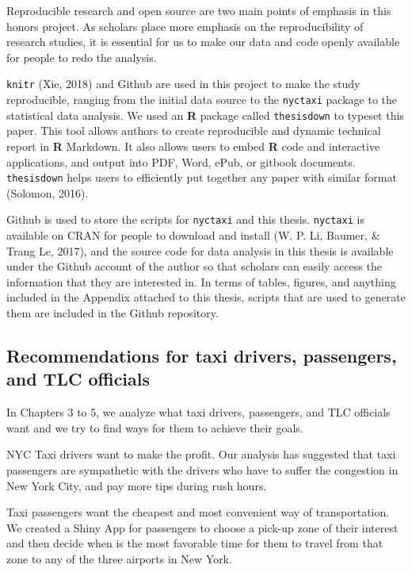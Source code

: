 \documentclass[12pt,twoside]{reedthesis}
\theoremstyle{definition}
\theoremstyle{definition}
\theoremstyle{definition}
\theoremstyle{remark}
\begin{document}
Reproducible research and open source are two main points of emphasis in
this honors project. As scholars place more emphasis on the
reproducibility of research studies, it is essential for us to make our
data and code openly available for people to redo the analysis.

\texttt{knitr} (Xie, 2018) and Github are used in this project to make
the study reproducible, ranging from the initial data source to the
\texttt{nyctaxi} package to the statistical data analysis. We used an
\textbf{R} package called \texttt{thesisdown} to typeset this paper.
This tool allows authors to create reproducible and dynamic technical
report in \textbf{R} Markdown. It also allows users to embed \textbf{R}
code and interactive applications, and output into PDF, Word, ePub, or
gitbook documents. \texttt{thesisdown} helps users to efficiently put
together any paper with similar format (Solomon, 2016).

Github is used to store the scripts for \texttt{nyctaxi} and this
thesis. \texttt{nyctaxi} is available on CRAN for people to download and
install (W. P. Li, Baumer, \& Trang Le, 2017), and the source code for
data analysis in this thesis is available under the Github account of
the author so that scholars can easily access the information that they
are interested in. In terms of tables, figures, and anything included in
the Appendix attached to this thesis, scripts that are used to generate
them are included in the Github repository.

\subsection{Recommendations for taxi drivers, passengers, and TLC
officials}\label{recommendations-for-taxi-drivers-passengers-and-tlc-officials}

In Chapters 3 to 5, we analyze what taxi drivers, passengers, and TLC
officials want and we try to find ways for them to achieve their goals.

NYC Taxi drivers want to make the profit. Our analysis has suggested
that taxi passengers are sympathetic with the drivers who have to suffer
the congestion in New York City, and pay more tips during rush hours.

Taxi passengers want the cheapest and most convenient way of
transportation. We created a Shiny App for passengers to choose a
pick-up zone of their interest and then decide when is the most
favorable time for them to travel from that zone to any of the three
airports in New York.
\end{document}
